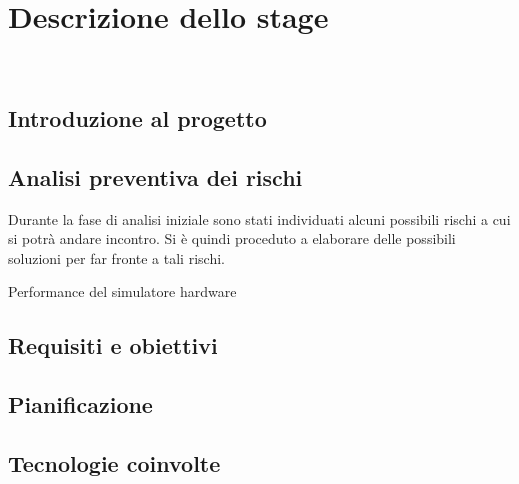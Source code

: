 
\chapter{Descrizione dello stage}
\label{cap:descrizione-stage}

\\

\section{Introduzione al progetto}

\section{Analisi preventiva dei rischi}

Durante la fase di analisi iniziale sono stati individuati alcuni possibili rischi a cui si potrà andare incontro.
Si è quindi proceduto a elaborare delle possibili soluzioni per far fronte a tali rischi.\\

\begin{risk}{Performance del simulatore hardware}
	\label{risk:hardware-simulator} 
\end{risk}

\section{Requisiti e obiettivi}


\section{Pianificazione}

\section{Tecnologie coinvolte}
